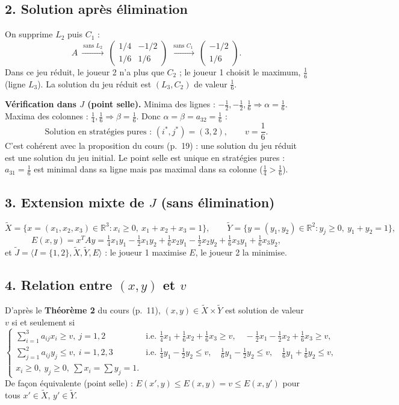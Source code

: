 \documentclass[11pt,a4paper]{article}
\newcommand{\Xt}{\tilde{X}}
\newcommand{\Yt}{\tilde{Y}}
\begin{document}
\subsection*{2. Solution après élimination}
On supprime $L_2$ puis $C_1$ :
\[
A\ \xrightarrow{\ \text{sans } L_2\ }\ \begin{pmatrix}1/4&-1/2\\1/6&1/6\end{pmatrix}\ \xrightarrow{\ \text{sans } C_1\ }\ \begin{pmatrix}-1/2\\1/6\end{pmatrix}.
\]
Dans ce jeu réduit, le joueur 2 n'a plus que $C_2$ ; le joueur 1 choisit le maximum, $\frac16$ (ligne $L_3$). La solution du jeu réduit est $(L_3,C_2)$ de valeur $\frac16$.

\textbf{Vérification dans $J$ (point selle).} Minima des lignes : $-\frac12,-\frac12,\frac16\Rightarrow\alpha=\frac16$. Maxima des colonnes : $\frac14,\frac16\Rightarrow\beta=\frac16$. Donc $\alpha=\beta=a_{32}=\frac16$ :
\[
\boxed{\text{Solution en stratégies pures : } (i^*,j^*)=(3,2),\qquad v=\frac16.}
\]
C'est cohérent avec la proposition du cours (p.~19) : une solution du jeu réduit est une solution du jeu initial. Le point selle est unique en stratégies pures : $a_{31}=\frac16$ est minimal dans sa ligne mais pas maximal dans sa colonne ($\frac14>\frac16$).

\subsection*{3. Extension mixte de $J$ (sans élimination)}
\[
\Xt=\{x=(x_1,x_2,x_3)\in\mathbb{R}^3: x_i\ge0,\ x_1+x_2+x_3=1\},\qquad \Yt=\{y=(y_1,y_2)\in\mathbb{R}^2: y_j\ge0,\ y_1+y_2=1\},
\]
\[
E(x,y)=x^TAy=\tfrac14x_1y_1-\tfrac12x_1y_2+\tfrac16x_2y_1-\tfrac12x_2y_2+\tfrac16x_3y_1+\tfrac16x_3y_2,
\]
et $\tilde J=\langle I=\{1,2\},\Xt,\Yt,E\rangle$ : le joueur 1 maximise $E$, le joueur 2 la minimise.

\subsection*{4. Relation entre $(x,y)$ et $v$}
D'après le \textbf{Théorème 2} du cours (p.~11), $(x,y)\in\Xt\times\Yt$ est solution de valeur $v$ si et seulement si
\[
\begin{cases}
\sum_{i=1}^3 a_{ij}x_i\ge v,\ j=1,2 & \text{i.e. } \frac14x_1+\frac16x_2+\frac16x_3\ge v,\quad -\frac12x_1-\frac12x_2+\frac16x_3\ge v,\\[1mm]
\sum_{j=1}^2 a_{ij}y_j\le v,\ i=1,2,3 & \text{i.e. } \frac14y_1-\frac12y_2\le v,\quad \frac16y_1-\frac12y_2\le v,\quad \frac16y_1+\frac16y_2\le v,\\[1mm]
x_i\ge0,\ y_j\ge0,\ \sum x_i=\sum y_j=1.
\end{cases}
\]
De façon équivalente (point selle) : $E(x',y)\le E(x,y)=v\le E(x,y')$ pour tous $x'\in\Xt$, $y'\in\Yt$.
\end{document}
